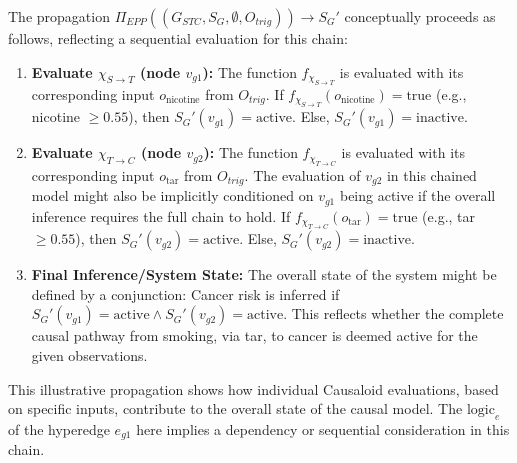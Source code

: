 The propagation \(\Pi_{EPP}((G_{STC}, S_G, \emptyset, O_{trig})) \to S_G'\) conceptually proceeds as follows, reflecting a sequential evaluation for this chain:
\begin{enumerate}
    \item \textbf{Evaluate \(\chi_{S \to T}\) (node \(v_{g1}\)):}
    The function \(f_{\chi_{S \to T}}\) is evaluated with its corresponding input \(o_{\text{nicotine}}\) from \(O_{trig}\).
    If \(f_{\chi_{S \to T}}(o_{\text{nicotine}}) = \text{true}\) (e.g., nicotine \(\ge 0.55\)), then \(S_G'(v_{g1}) = \text{active}\). Else, \(S_G'(v_{g1}) = \text{inactive}\).
    \item \textbf{Evaluate \(\chi_{T \to C}\) (node \(v_{g2}\)):}
    The function \(f_{\chi_{T \to C}}\) is evaluated with its corresponding input \(o_{\text{tar}}\) from \(O_{trig}\). The evaluation of \(v_{g2}\) in this chained model might also be implicitly conditioned on \(v_{g1}\) being active if the overall inference requires the full chain to hold.
    If \(f_{\chi_{T \to C}}(o_{\text{tar}}) = \text{true}\) (e.g., tar \(\ge 0.55\)), then \(S_G'(v_{g2}) = \text{active}\). Else, \(S_G'(v_{g2}) = \text{inactive}\).
    \item \textbf{Final Inference/System State:} The overall state of the system might be defined by a conjunction: Cancer risk is inferred if \(S_G'(v_{g1}) = \text{active} \land S_G'(v_{g2}) = \text{active}\). This reflects whether the complete causal pathway from smoking, via tar, to cancer is deemed active for the given observations.
\end{enumerate}
This illustrative propagation shows how individual Causaloid evaluations, based on specific inputs, contribute to the overall state of the causal model. The \(\text{logic}_e\) of the hyperedge \(e_{g1}\) here implies a dependency or sequential consideration in this chain.

